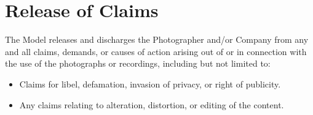 
\section{Release of Claims}
\label{sec:claims}

The Model releases and discharges the Photographer and/or Company from any and all claims, demands, or causes of action arising out of or in connection with the use of the photographs or recordings, including but not limited to:

\begin{itemize}
  \item Claims for libel, defamation, invasion of privacy, or right of publicity.
  \item Any claims relating to alteration, distortion, or editing of the content.
\end{itemize}

